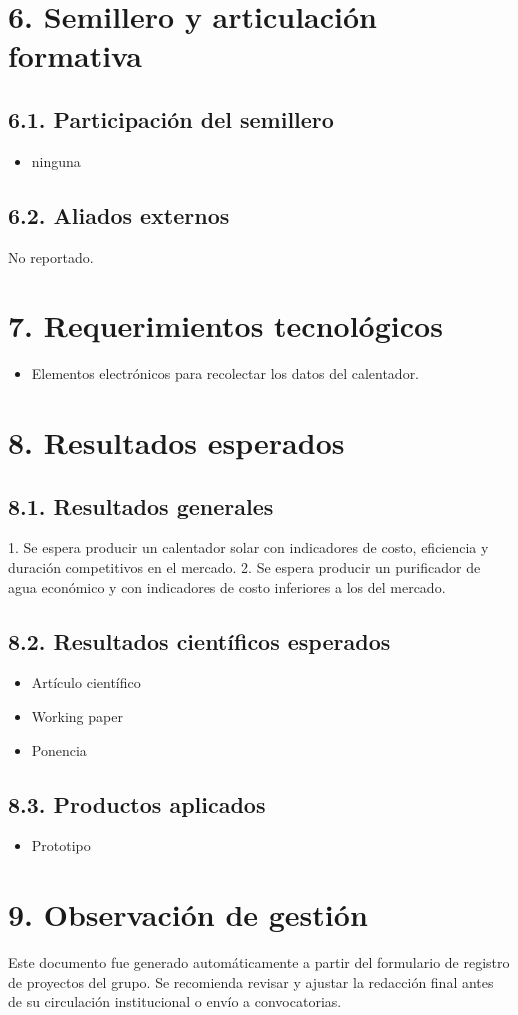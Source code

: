 \documentclass[a4paper,12pt]{article}
\begin{document}
\section*{6. Semillero y articulación formativa}
\subsection*{6.1. Participación del semillero}
\begin{itemize}
    \item ninguna
\end{itemize}

\subsection*{6.2. Aliados externos}
No reportado.

\section*{7. Requerimientos tecnológicos}
\begin{itemize}
    \item Elementos electrónicos para recolectar los datos del calentador.
\end{itemize}

\section*{8. Resultados esperados}
\subsection*{8.1. Resultados generales}
1. Se espera producir un calentador solar con indicadores de costo, eficiencia y duración competitivos en el mercado. 2. Se espera producir un purificador de agua económico y con indicadores de costo inferiores a los del mercado.

\subsection*{8.2. Resultados científicos esperados}
\begin{itemize}
    \item Artículo científico
    \item Working paper
    \item Ponencia
\end{itemize}

\subsection*{8.3. Productos aplicados}
\begin{itemize}
    \item Prototipo
\end{itemize}

\section*{9. Observación de gestión}
Este documento fue generado automáticamente a partir del formulario de registro de proyectos del grupo. Se recomienda revisar y ajustar la redacción final antes de su circulación institucional o envío a convocatorias.
\end{document}
